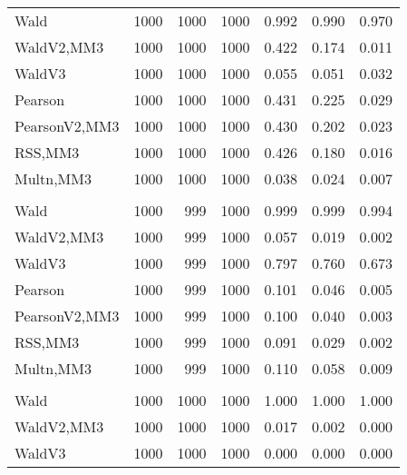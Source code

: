 \documentclass[
]{article}
\begin{document}
\begin{table}[H]
{\begin{tabular}[t]{lrrrrrr}
\hspace{1em}Wald & 1000 & 1000 & 1000 & 0.992 & 0.990 & 0.970\\
\hspace{1em}WaldV2,MM3 & 1000 & 1000 & 1000 & 0.422 & 0.174 & 0.011\\
\hspace{1em}WaldV3 & 1000 & 1000 & 1000 & 0.055 & 0.051 & 0.032\\
\hspace{1em}Pearson & 1000 & 1000 & 1000 & 0.431 & 0.225 & 0.029\\
\hspace{1em}PearsonV2,MM3 & 1000 & 1000 & 1000 & 0.430 & 0.202 & 0.023\\
\hspace{1em}RSS,MM3 & 1000 & 1000 & 1000 & 0.426 & 0.180 & 0.016\\
\hspace{1em}Multn,MM3 & 1000 & 1000 & 1000 & 0.038 & 0.024 & 0.007\\
\addlinespace[0.3em]
\multicolumn{7}{l}{\textbf{2F 10V}}\\
\hspace{1em}Wald & 1000 & 999 & 1000 & 0.999 & 0.999 & 0.994\\
\hspace{1em}WaldV2,MM3 & 1000 & 999 & 1000 & 0.057 & 0.019 & 0.002\\
\hspace{1em}WaldV3 & 1000 & 999 & 1000 & 0.797 & 0.760 & 0.673\\
\hspace{1em}Pearson & 1000 & 999 & 1000 & 0.101 & 0.046 & 0.005\\
\hspace{1em}PearsonV2,MM3 & 1000 & 999 & 1000 & 0.100 & 0.040 & 0.003\\
\hspace{1em}RSS,MM3 & 1000 & 999 & 1000 & 0.091 & 0.029 & 0.002\\
\hspace{1em}Multn,MM3 & 1000 & 999 & 1000 & 0.110 & 0.058 & 0.009\\
\addlinespace[0.3em]
\multicolumn{7}{l}{\textbf{3F 15V}}\\
\hspace{1em}Wald & 1000 & 1000 & 1000 & 1.000 & 1.000 & 1.000\\
\hspace{1em}WaldV2,MM3 & 1000 & 1000 & 1000 & 0.017 & 0.002 & 0.000\\
\hspace{1em}WaldV3 & 1000 & 1000 & 1000 & 0.000 & 0.000 & 0.000\\

\end{tabular}}
\end{table}
\end{document}

